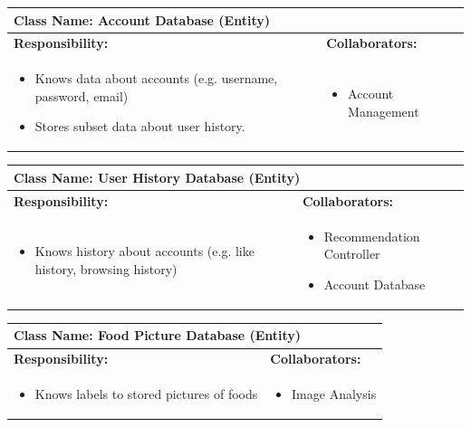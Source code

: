 \documentclass[]{article}
\begin{document}
\begin{table}[H]
	\centering
	\begin{tabular}{|p{7cm}|p{7cm}|}
	\hline 
	 \multicolumn{2}{|l|}{\textbf{Class Name:} Account Database (Entity) }\\
	\hline
	\textbf{Responsibility:} & \textbf{Collaborators:} \\
	\hline
	\raggedright
	\begin{itemize}
		\item Knows data about accounts (e.g. username, password, email)
		\item Stores subset data about user history.
	\end{itemize}
	\vspace{1in} & 
	\begin{itemize}
		\item Account Management
	\end{itemize} \\
	\hline
	\end{tabular}
\end{table}

\begin{table}[H]
	\centering
	\begin{tabular}{|p{7cm}|p{7cm}|}
	\hline 
	 \multicolumn{2}{|l|}{\textbf{Class Name:} User History Database (Entity) }\\
	\hline
	\textbf{Responsibility:} & \textbf{Collaborators:} \\
	\hline
	\raggedright
	\begin{itemize}
		\item Knows history about accounts (e.g. like history, browsing history)
	\end{itemize}
	\vspace{1in} & 
	\begin{itemize}
		\item Recommendation Controller
		\item Account Database
	\end{itemize} \\
	\hline
	\end{tabular}
\end{table}

\begin{table}[H]
	\centering
	\begin{tabular}{|p{7cm}|p{7cm}|}
	\hline 
	 \multicolumn{2}{|l|}{\textbf{Class Name:} Food Picture Database (Entity) }\\
	\hline
	\textbf{Responsibility:} & \textbf{Collaborators:} \\
	\hline
	\raggedright
	\begin{itemize}
		\item Knows labels to stored pictures of foods 
	\end{itemize}
	\vspace{1in} & 
	\begin{itemize}
		\item Image Analysis
	\end{itemize} \\
	\hline
	\end{tabular}
\end{table}
\end{document}
